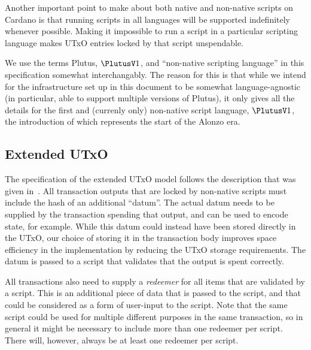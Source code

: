 Another important point to make about both native and non-native scripts on Cardano is that
running scripts in all languages will be supported indefinitely whenever possible.
Making it impossible to run a script in a particular scripting language
makes UTxO entries locked by that script unspendable.

We use the terms Plutus, $\PlutusV1$, and ``non-native scripting language'' in this specification
somewhat interchangably. The reason for this is that while we intend for the infrastructure
set up in this document to be somewhat language-agnostic (in particular,
able to support multiple versions of Plutus), it only gives all the details for
the first and (currenly only) non-native script language, $\PlutusV1$, 
the introduction of which represents the
start of the Alonzo era.


\subsection{Extended UTxO}

The specification of the extended UTxO model follows the description that was given in~\cite{plutus_eutxo}.
All transaction outputs that are locked by non-native scripts must include the hash of an additional ``datum''. The actual datum needs to be supplied by the transaction spending that output, and can be used to encode state, for example.
While this datum could instead have been stored directly in the UTxO, our choice of storing it in the transaction body improves space efficiency in the implementation by reducing the UTxO storage requirements. The datum is passed to a script that validates that the output is spent correctly.

All transactions also need to supply a \emph{redeemer} for all items that are validated by a script. This is an additional piece of data that is passed to the script, and that could be considered as a form of user-input to the script. Note that the same script could be used for multiple different purposes in the same transaction, so in general it might be necessary to include more than one redeemer per script.
There will, however, always be at least one redeemer per script.
